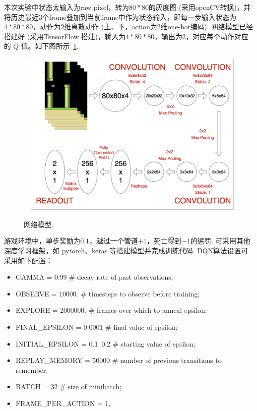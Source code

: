 \documentclass[a4paper,UTF8]{article}
\numberwithin{equation}{section}
\begin{document}
本次实验中状态太输入为raw pixel，转为$80*80$的灰度图 (采用openCV转换)，并将历史最近$3$个frame叠加到当前frame中作为状态输入，即每一步输入状态为$4*80*80$，动作为$2$维离散动作 (上、下，action为$2$维one-hot编码). 网络模型已经搭建好 (采用TensorFlow 搭建)，输入为$4*80*80$，输出为$2$，对应每个动作对应的 $Q$ 值。如下图所示~\ref{fig:rl_1}.
\begin{figure}[!htb]
	\centering
	\includegraphics[scale=0.4]{rl_1.png}
	\caption{网络模型.}
	\label{fig:rl_1}
\end{figure}

游戏环境中，单步奖励为$0.1$，越过一个管道$+1$，死亡得到$-1$的惩罚. 可采用其他深度学习框架，如 pytorch、keras 等搭建模型并完成训练代码. DQN算法设置可采用如下配置：
\begin{itemize}
	\item GAMMA = 0.99 \# decay rate of past observations;
	\item OBSERVE = 10000. \# timesteps to observe before training;
	\item EXPLORE = 2000000. \# frames over which to anneal epsilon;
	\item FINAL\_EPSILON = 0.0001 \# final value of epsilon;
	\item INITIAL\_EPSILON = 0.1~0.2 \# starting value of epsilon;
	\item REPLAY\_MEMORY = 50000 \# number of previous transitions to remember;
	\item BATCH = 32 \# size of minibatch;
	\item FRAME\_PER\_ACTION = 1.
\end{itemize}
\end{document}
